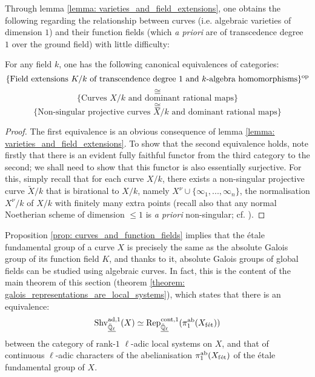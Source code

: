         Through lemma \ref{lemma: varieties_and_field_extensions}, one obtains the following regarding the relationship between curves (i.e. algebraic varieties of dimension $1$) and their function fields (which \textit{a priori} are of transcedence degree $1$ over the ground field) with little difficulty:
        \begin{proposition} \label{prop: curves_and_function_fields}
            \cite[\href{https://stacks.math.columbia.edu/tag/0BY1}{Tag 0BY1}]{stacks} For any field $k$, one has the following canonical equivalences of categories:
                $$\{\text{Field extensions $K/k$ of transcendence degree $1$ and $k$-algebra homomorphisms}\}^{\mathrm{op}}$$
                $$\cong$$
                $$\{\text{Curves $X/k$ and dominant rational maps}\}$$
                $$\cong$$
                $$\{\text{Non-singular projective curves $X/k$ and dominant rational maps}\}$$
        \end{proposition}
            \begin{proof}
                The first equivalence is an obvious consequence of lemma \ref{lemma: varieties_and_field_extensions}. To show that the second equivalence holds, note firstly that there is an evident fully faithful functor from the third category to the second; we shall need to show that this functor is also essentially surjective. For this, simply recall that for each curve $X/k$, there exists a non-singular projective curve $\tilde{X}/k$ that is birational to $X/k$, namely $X^{\nu} \cup \{\infty_1, ..., \infty_n\}$, the normalisation $X^{\nu}/k$ of $X/k$ with finitely many extra points (recall also that any normal Noetherian scheme of dimension $\leq 1$ is \textit{a priori} non-singular; cf. \cite[\href{https://stacks.math.columbia.edu/tag/0BX2}{Tag 0BX2}]{stacks}).
            \end{proof}
        Proposition \ref{prop: curves_and_function_fields} implies that the \'etale fundamental group of a curve $X$ is precisely the same as the absolute Galois group of its function field $K$, and thanks to it, absolute Galois groups of global fields can be studied using algebraic curves. In fact, this is the content of the main theorem of this section (theorem \ref{theorem: galois_representations_are_local_systems}), which states that there is an equivalence:
            $$\mathrm{Shv}^{\mathrm{ad}, 1}_{\underline{\bar{\mathbb{Q}}_{\ell}}}(X) \simeq \mathrm{Rep}^{\mathrm{cont}, 1}_{\underline{\bar{\mathbb{Q}}_{\ell}}}(\pi_1^{\mathrm{ab}}(X_{\mathrm{f\acute{e}t}}))$$
        between the category of rank-$1$ $\ell$-adic local systems on $X$, and that of continuous $\ell$-adic characters of the abelianisation $\pi_1^{\mathrm{ab}}(X_{\mathrm{f\acute{e}t}})$ of the \'etale fundamental group of $X$. 
    
